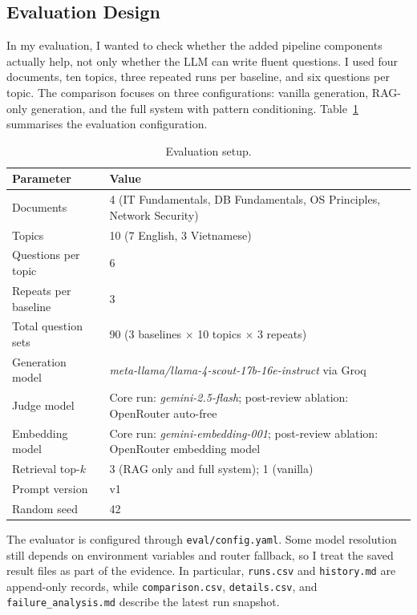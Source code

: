 \documentclass[12pt,a4paper]{article}
\begin{document}
\subsection{Evaluation Design}

In my evaluation, I wanted to check whether the added pipeline components
actually help, not only whether the LLM can write fluent questions. I used
four documents, ten topics, three repeated runs per baseline, and six
questions per topic. The comparison focuses on three configurations:
vanilla generation, RAG-only generation, and the full system with pattern
conditioning. Table~\ref{tab:eval-setup} summarises the evaluation
configuration.

\begin{table}[H]
  \centering
  \singlespacing
  \caption{Evaluation setup.}
  \label{tab:eval-setup}
  \small
  \begin{tabular}{@{}p{3.2cm}p{10.2cm}@{}}
    \toprule
    \textbf{Parameter} & \textbf{Value} \\
    \midrule
    Documents           & 4 (IT Fundamentals, DB Fundamentals, OS Principles, Network Security) \\
    Topics              & 10 (7 English, 3 Vietnamese) \\
    Questions per topic & 6 \\
    Repeats per baseline & 3 \\
    Total question sets  & 90 (3 baselines $\times$ 10 topics $\times$ 3 repeats) \\
    Generation model    & \textit{meta-llama/llama-4-scout-17b-16e-instruct} via Groq \\
    Judge model         & Core run: \textit{gemini-2.5-flash}; post-review ablation: OpenRouter auto-free \\
    Embedding model     & Core run: \textit{gemini-embedding-001}; post-review ablation: OpenRouter embedding model \\
    Retrieval top-$k$   & 3 (RAG only and full system); 1 (vanilla) \\
    Prompt version      & v1 \\
    Random seed         & 42 \\
    \bottomrule
  \end{tabular}
\end{table}

The evaluator is configured through \texttt{eval/config.yaml}. Some model
resolution still depends on environment variables and router fallback, so I
treat the saved result files as part of the evidence. In particular,
\texttt{runs.csv} and \texttt{history.md} are append-only records, while
\texttt{comparison.csv}, \texttt{details.csv}, and
\texttt{failure\_analysis.md} describe the latest run snapshot.
\end{document}
